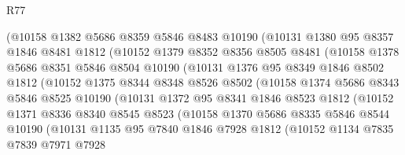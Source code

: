 \begin{lexlean}{R77}
\begin{coremodule}
              (@10158
                @1382
                @5686
                @8359
                @5846
                @8483
                @10190
                (@10131
                  @1380
                  @95
                  @8357
                  @1846
                  @8481
                  @1812
                  (@10152
                    @1379
                    @8352
                    @8356
                    @8505
                    @8481
                    (@10158
                      @1378
                      @5686
                      @8351
                      @5846
                      @8504
                      @10190
                      (@10131
                        @1376
                        @95
                        @8349
                        @1846
                        @8502
                        @1812
                        (@10152
                          @1375
                          @8344
                          @8348
                          @8526
                          @8502
                          (@10158
                            @1374
                            @5686
                            @8343
                            @5846
                            @8525
                            @10190
                            (@10131
                              @1372
                              @95
                              @8341
                              @1846
                              @8523
                              @1812
                              (@10152
                                @1371
                                @8336
                                @8340
                                @8545
                                @8523
                                (@10158
                                  @1370
                                  @5686
                                  @8335
                                  @5846
                                  @8544
                                  @10190
                                  (@10131
                                    @1135
                                    @95
                                    @7840
                                    @1846
                                    @7928
                                    @1812
                                    (@10152
                                      @1134
                                      @7835
                                      @7839
                                      @7971
                                      @7928

\end{coremodule}
\end{lexlean}
